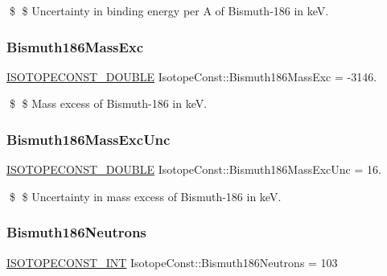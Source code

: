 \$ \$ Uncertainty in binding energy per A of Bismuth-\/186 in keV. \mbox{\label{group___isotope_const-_bismuth-_bi186_ga4d42caceb40d567a7d5470a291625244}} 
\subsubsection{\texorpdfstring{Bismuth186\+Mass\+Exc}{Bismuth186MassExc}}
{\footnotesize\ttfamily \mbox{\hyperlink{group___isotope_const-_macros_ga8f45a7272ce02c0b4c65c44636ed719a}{I\+S\+O\+T\+O\+P\+E\+C\+O\+N\+S\+T\+\_\+\+D\+O\+U\+B\+LE}} Isotope\+Const\+::\+Bismuth186\+Mass\+Exc = -\/3146.}

\$ \$ Mass excess of Bismuth-\/186 in keV. \mbox{\label{group___isotope_const-_bismuth-_bi186_ga2929c049673be6096b12f3878ae80976}} 
\subsubsection{\texorpdfstring{Bismuth186\+Mass\+Exc\+Unc}{Bismuth186MassExcUnc}}
{\footnotesize\ttfamily \mbox{\hyperlink{group___isotope_const-_macros_ga8f45a7272ce02c0b4c65c44636ed719a}{I\+S\+O\+T\+O\+P\+E\+C\+O\+N\+S\+T\+\_\+\+D\+O\+U\+B\+LE}} Isotope\+Const\+::\+Bismuth186\+Mass\+Exc\+Unc = 16.}

\$ \$ Uncertainty in mass excess of Bismuth-\/186 in keV. \mbox{\label{group___isotope_const-_bismuth-_bi186_ga6683beeb11f9ded17e961421d3f8a72e}} 
\subsubsection{\texorpdfstring{Bismuth186\+Neutrons}{Bismuth186Neutrons}}
{\footnotesize\ttfamily \mbox{\hyperlink{group___isotope_const-_macros_ga5f18360b3e99483a35c32d789e62621c}{I\+S\+O\+T\+O\+P\+E\+C\+O\+N\+S\+T\+\_\+\+I\+NT}} Isotope\+Const\+::\+Bismuth186\+Neutrons = 103}

